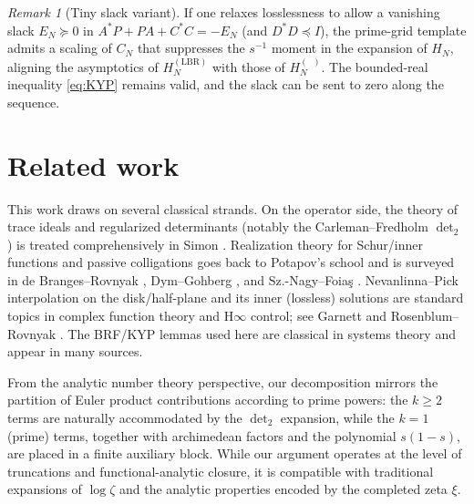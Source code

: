 \documentclass[11pt]{article}
\theoremstyle{remark}
\newtheorem{remark}[theorem]{Remark}
\DeclareMathOperator{\dettwo}{det_2}
\begin{document}
\begin{remark}[Tiny slack variant]
If one relaxes losslessness to allow a vanishing slack \(E_N\succeq 0\) in \(A^*P+PA+C^*C=-E_N\) (and \(D^*D\preceq I\)), the prime-grid template admits a scaling of \(C_N\) that suppresses the \(s^{-1}\) moment in the expansion of \(H_N\), aligning the asymptotics of \(H_N^{(\mathrm{LBR})}\) with those of \(H_N^{(\dettwo)}\). The bounded-real inequality \eqref{eq:KYP} remains valid, and the slack can be sent to zero along the sequence.
\end{remark}

\section{Related work}\label{sec:related}
This work draws on several classical strands. On the operator side, the theory of trace ideals and regularized determinants (notably the Carleman--Fredholm \(\det_2\)) is treated comprehensively in Simon \cite{SimonTraceIdeals}. Realization theory for Schur/inner functions and passive colligations goes back to Potapov's school and is surveyed in de Branges--Rovnyak \cite{deBrangesRovnyak}, Dym--Gohberg \cite{DymGohberg}, and Sz.-Nagy--Foia\c{s} \cite{SzNagyFoias}. Nevanlinna--Pick interpolation on the disk/half-plane and its inner (lossless) solutions are standard topics in complex function theory and H\(\infty\) control; see Garnett \cite{Garnett} and Rosenblum--Rovnyak \cite{RosenblumRovnyak}. The BRF/KYP lemmas used here are classical in systems theory and appear in many sources.

From the analytic number theory perspective, our decomposition mirrors the partition of Euler product contributions according to prime powers: the \(k\ge 2\) terms are naturally accommodated by the \(\det_2\) expansion, while the \(k=1\) (prime) terms, together with archimedean factors and the polynomial \(s(1-s)\), are placed in a finite auxiliary block. While our argument operates at the level of truncations and functional-analytic closure, it is compatible with traditional expansions of \(\log \zeta\) and the analytic properties encoded by the completed zeta \(\xi\).
\end{document}
